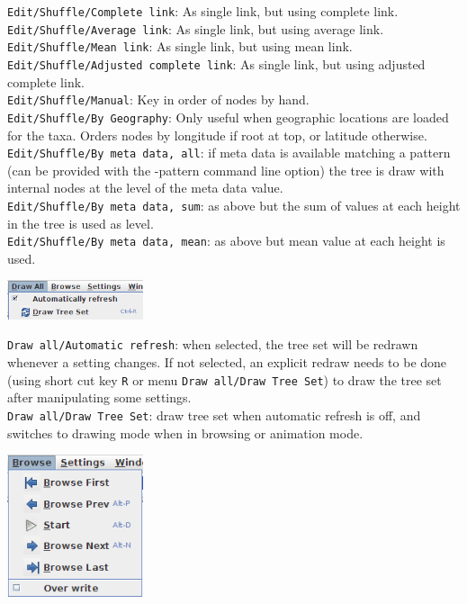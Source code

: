 \documentclass{article}
\begin{document}
{\tt Edit/Shuffle/Complete link}: As single link, but using complete link.\\
{\tt Edit/Shuffle/Average link}: As single link, but using average link.\\
{\tt Edit/Shuffle/Mean link}: As single link, but using mean link.\\
{\tt Edit/Shuffle/Adjusted complete link}: As single link, but using adjusted complete link.\\
{\tt Edit/Shuffle/Manual}: Key in order of nodes by hand.\\
{\tt Edit/Shuffle/By Geography}: Only useful when geographic locations are loaded for the taxa.
Orders nodes by longitude if root at top, or latitude otherwise.\\
{\tt Edit/Shuffle/By meta data, all}: if meta data is available matching a pattern (can be
provided with the -pattern command line option) the tree is draw with internal nodes at
the level of the meta data value.\\
{\tt Edit/Shuffle/By meta data, sum}: as above but the sum of values at each height in the
tree is used as level.\\
{\tt Edit/Shuffle/By meta data, mean}: as above but mean value at each height is used.\\


\begin{center}
\includegraphics[width=4cm]{menudrawall.png}
\end{center}

\noindent
{\tt Draw all/Automatic refresh}: when selected, the tree set will be redrawn whenever a setting
changes. If not selected, an explicit redraw needs to be done (using short cut key {\tt R} or 
menu {\tt Draw all/Draw Tree Set}) to draw the tree set after manipulating some settings.\\
{\tt Draw all/Draw Tree Set}: draw tree set when automatic refresh is off, and switches to
drawing mode when in browsing or animation mode.


\begin{center}
\includegraphics[width=4cm]{menubrowse.png}
\end{center}
\end{document}
